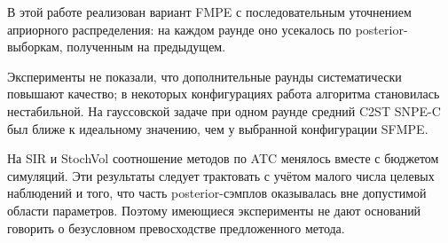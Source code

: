 В этой работе реализован вариант FMPE с последовательным уточнением
априорного распределения: на каждом раунде оно усекалось по
posterior-выборкам, полученным на предыдущем.

Эксперименты не показали, что дополнительные раунды систематически
повышают качество; в некоторых конфигурациях работа алгоритма становилась
нестабильной. На гауссовской задаче при одном раунде средний C2ST SNPE-C
был ближе к идеальному значению, чем у выбранной конфигурации SFMPE.

На SIR и StochVol соотношение методов по ATC менялось вместе с бюджетом
симуляций. Эти результаты следует трактовать с учётом малого числа
целевых наблюдений и того, что часть posterior-сэмплов оказывалась вне
допустимой области параметров. Поэтому имеющиеся эксперименты не дают
оснований говорить о безусловном превосходстве предложенного метода.
